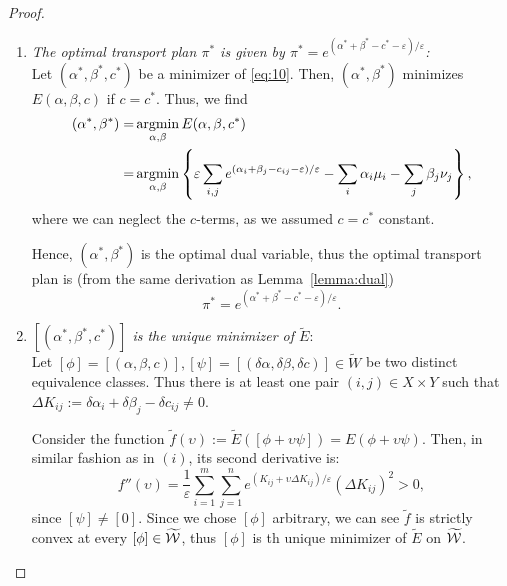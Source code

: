 \begin{proof}
\begin{enumerate}[label=(\roman*)]
		\item \textit{The optimal transport plan $\pi^{*}$ is given by $\pi^{*}=e^{\left(\alpha^{*}+\beta^{*}-c^{*}-\varepsilon\right) / \varepsilon} $:}\\
		Let $(\alpha^*, \beta^*, c^*)$ be a minimizer of \eqref{eq:10}. Then, $(\alpha^*, \beta^*)$ minimizes $E(\alpha, \beta, c)$ if $c = c^*$. Thus, we find 
		\begin{align*}
			(\alpha^*, \beta^*) = & \operatorname*{argmin}_{\alpha, \beta} E(\alpha, \beta, c^*) \\ 
			= & \operatorname*{argmin}_{\alpha, \beta} \left\{ \varepsilon \sum_{i,j} e^{(\alpha_i + \beta_j - c_{ij}-\varepsilon)/\varepsilon} - \sum_i \alpha_i \mu_i - \sum_j \beta_j \nu_j \right\},
		\end{align*}
		where we can neglect the $c$-terms, as we assumed $c = c^*$ constant. \par 
		Hence, $(\alpha^*, \beta^*)$ is the optimal dual variable, thus the optimal transport plan is (from the same derivation as Lemma~\ref{lemma:dual}) 
		\[\pi^* = e^{(\alpha^* + \beta^* - c^*-\varepsilon)/\varepsilon} . \]
		
		\item \textit{$\left[\left(\alpha^{*}, \beta^{*}, c^{*}\right)\right]$ is the unique minimizer of $\widetilde{E}$}:\\
		Let $[\phi] = [(\alpha, \beta, c)], [\psi] = [(\delta \alpha, \delta \beta, \delta c)] \in \widetilde{W}$ be two distinct equivalence classes. Thus there is at least one pair $(i,j) \in X \times Y$ such that $\Delta K_{ij} := \delta\alpha_i + \delta\beta_j - \delta c_{ij} \neq 0$. \par 		
		Consider the function $\widetilde{f}(\upsilon) := \widetilde{E}([\phi + \upsilon \psi]) = E(\phi + \upsilon \psi)$. Then, in similar fashion as in $(i)$, its second derivative is:
		\[f''(\upsilon) = \frac{1}{\varepsilon} \sum_{i=1}^m \sum_{j=1}^n e^{(K_{ij} + \upsilon \Delta K_{ij})/\varepsilon} (\Delta K_{ij})^2 > 0,\]
		since $[\psi] \neq [0]$. Since we chose $[\phi]$ arbitrary, we can see $\widetilde{f}$ is strictly convex at every $[\phi] \in \widetilde{\mathcal{W}}$, thus $[\phi]$ is th unique minimizer of $\widetilde{E}$ on $\widetilde{\mathcal{W}}$. 
	\end{enumerate}
\end{proof}

